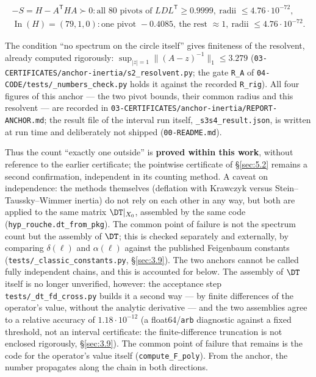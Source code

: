 \begin{gather*}
-S = H - A^{\mathsf{T}}HA \succ 0 :  \text{all 80 pivots of } LDL^{\mathsf{T}} \ge 0.9999,\ \text{radii } \le 4.76\cdot 10^{-72}, \\
\operatorname{In}(H) = (79, 1, 0) :  \text{one pivot } -0.4085,\ \text{the rest } \approx 1,\ \text{radii } \le 4.76\cdot 10^{-72}.
\end{gather*}

The condition ``no spectrum on the circle itself'' gives finiteness of the
resolvent, already computed rigorously: $\sup_{|z|=1}\|(A - z)^{-1}\|_{1} \le 3.279$
(\texttt{03-\allowbreak CERTIFICATES/\allowbreak anchor-\allowbreak inertia/\allowbreak s2\_\allowbreak resolvent.py};
the gate \texttt{R\_A} of \texttt{04-\allowbreak CODE/\allowbreak tests/\allowbreak \_\allowbreak numbers\_\allowbreak check.py}
holds it against the recorded \texttt{R\_\allowbreak rig}). All four figures of
this anchor --- the two pivot bounds, their common radius and this resolvent ---
are recorded in
\texttt{03-\allowbreak CERTIFICATES/\allowbreak anchor-\allowbreak inertia/\allowbreak REPORT-\allowbreak ANCHOR.md};
the result file of the interval run itself,
\texttt{\_\allowbreak s3s4\_\allowbreak result.json}, is written at run time and
deliberately not shipped (\texttt{00-\allowbreak README.md}).

Thus the count ``exactly one outside'' is \textbf{proved within this work},
without reference to the earlier certificate; the pointwise certificate of
\S\ref{sec:5.2} remains a second confirmation, independent in its counting method. A
caveat on independence: the methods themselves (deflation with Krawczyk
versus Stein--Taussky--Wimmer inertia) do not rely on each other in any way,
but both are applied to the same matrix $\DT|_{X_{0}}$, assembled by the same
code (\texttt{hyp\_\allowbreak rouche.dt\_\allowbreak from\_\allowbreak pkg}). The common point of failure is not the
spectrum count but the assembly of $\DT$; this is checked separately and
externally, by comparing $\delta(\ell)$ and $\alpha(\ell)$ against the
published Feigenbaum constants (\texttt{tests/\allowbreak \_\allowbreak classic\_\allowbreak constants.py}, \S\ref{sec:3.9}). The
two anchors cannot be called fully independent chains, and this is
accounted for below.
The assembly of $\DT$ itself is no longer unverified, however: the
acceptance step \texttt{tests/\allowbreak \_\allowbreak dt\_\allowbreak fd\_\allowbreak cross.py} builds it a second way --- by finite
differences of the operator's value, without the analytic derivative --- and
the two assemblies agree to a relative accuracy of $1.18\cdot 10^{-12}$ (a
float64/\texttt{arb} diagnostic against a fixed threshold, not an interval
certificate: the finite-difference truncation is not enclosed rigorously,
\S\ref{sec:3.9}). The
common point of failure that remains is the code for the operator's value
itself (\texttt{compute\_\allowbreak F\_\allowbreak poly}). From the anchor, the number propagates along the
chain in both directions.

